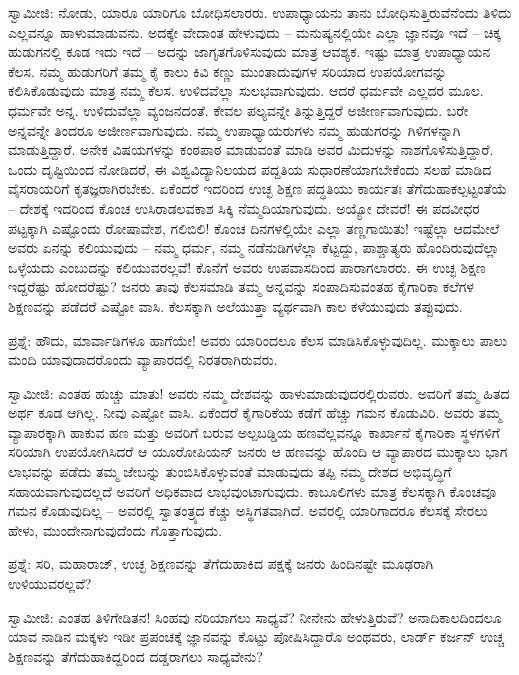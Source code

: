 ಸ್ವಾಮೀಜಿ: ನೋಡು, ಯಾರೂ ಯಾರಿಗೂ ಬೋಧಿಸಲಾರರು. ಉಪಾಧ್ಯಾಯನು ತಾನು ಬೋಧಿಸುತ್ತಿರುವೆನೆಂದು ತಿಳಿದು ಎಲ್ಲವನ್ನೂ ಹಾಳುಮಾಡುವನು. ಅದಕ್ಕೇ ವೇದಾಂತ ಹೇಳುವುದು – ಮನುಷ್ಯನಲ್ಲಿಯೇ ಎಲ್ಲಾ ಜ್ಞಾನವೂ ಇದೆ – ಚಿಕ್ಕ ಹುಡುಗನಲ್ಲಿ ಕೂಡ ಇದು ಇದೆ – ಅದನ್ನು ಜಾಗೃತಗೊಳಿಸುವುದು ಮಾತ್ರ ಆವಶ್ಯಕ. ಇಷ್ಟು ಮಾತ್ರ ಉಪಾಧ್ಯಾಯನ ಕೆಲಸ. ನಮ್ಮ ಹುಡುಗರಿಗೆ ತಮ್ಮ ಕೈ ಕಾಲು ಕಿವಿ ಕಣ್ಣು ಮುಂತಾದುವುಗಳ ಸರಿಯಾದ ಉಪಯೋಗವನ್ನು ಕಲಿಸಿಕೊಡುವುದು ಮಾತ್ರ ನಮ್ಮ ಕೆಲಸ. ಉಳಿದವೆಲ್ಲಾ ಸುಲಭವಾಗುವುದು. ಆದರೆ ಧರ್ಮವೇ ಎಲ್ಲದರ ಮೂಲ. ಧರ್ಮವೇ ಅನ್ನ. ಉಳಿದುವೆಲ್ಲಾ ವ್ಯಂಜನದಂತೆ. ಕೇವಲ ಪಲ್ಯವನ್ನೇ ತಿನ್ನುತ್ತಿದ್ದರೆ ಅಜೀರ್ಣವಾಗುವುದು. ಬರೇ ಅನ್ನವನ್ನೇ ತಿಂದರೂ ಅಜೀರ್ಣವಾಗುವುದು. ನಮ್ಮ ಉಪಾಧ್ಯಾಯರುಗಳು ನಮ್ಮ ಹುಡುಗರನ್ನು ಗಿಳಿಗಳನ್ನಾಗಿ ಮಾಡುತ್ತಿದ್ದಾರೆ. ಅನೇಕ ವಿಷಯಗಳನ್ನು ಕಂಠಪಾಠ ಮಾಡುವಂತೆ ಮಾಡಿ ಅವರ ಮಿದುಳನ್ನು ನಾಶಗೊಳಿಸುತ್ತಿದ್ದಾರೆ. ಒಂದು ದೃಷ್ಟಿಯಿಂದ ನೋಡಿದರೆ, ಈ ವಿಶ್ವವಿದ್ಯಾನಿಲಯದ ಪದ್ದತಿಯ ಸುಧಾರಣೆಯಾಗಬೇಕೆಂದು ಸಲಹೆ ಮಾಡಿದ ವೈಸರಾಯರಿಗೆ ಕೃತಜ್ಞರಾಗಿರಬೇಕು. ಏಕೆಂದರೆ ಇದರಿಂದ ಉಚ್ಛ ಶಿಕ್ಷಣ ಪದ್ಧತಿಯು ಕಾರ್ಯತಃ ತೆಗೆದುಹಾಕಲ್ಪಟ್ಟಂತೆಯೆ – ದೇಶಕ್ಕೆ ಇದರಿಂದ ಕೊಂಚ ಉಸಿರಾಡಲವಕಾಶ ಸಿಕ್ಕಿ ನೆಮ್ಮದಿಯಾಗುವುದು. ಅಯ್ಯೋ ದೇವರೆ! ಈ ಪದವೀಧರ ಪಟ್ಟಕ್ಕಾಗಿ ಎಷ್ಟೊಂದು ರೋಷಾವೇಶ, ಗಲಿಬಿಲಿ! ಕೊಂಚ ದಿನಗಳಲ್ಲಿಯೇ ಎಲ್ಲಾ ತಣ್ಣಗಾಯಿತು! ಇಷ್ಟೆಲ್ಲಾ ಆದಮೇಲೆ ಅವರು ಏನನ್ನು ಕಲಿಯುವುದು – ನಮ್ಮ ಧರ್ಮ, ನಮ್ಮ ನಡೆನುಡಿಗಳೆಲ್ಲಾ ಕೆಟ್ಟದ್ದು, ಪಾಶ್ಚಾತ್ಯರು ಹೊಂದಿರುವುದೆಲ್ಲಾ ಒಳ್ಳೆಯದು ಎಂಬುದನ್ನು ಕಲಿಯುವರಲ್ಲವೆ! ಕೊನೆಗೆ ಅವರು ಉಪವಾಸದಿಂದ ಪಾರಾಗಲಾರರು. ಈ ಉಚ್ಛ ಶಿಕ್ಷಣ ಇದ್ದರೆಷ್ಟು ಹೋದರೆಷ್ಟು? ಜನರು ತಾವು ಕೆಲಸಮಾಡಿ ತಮ್ಮ ಅನ್ನವನ್ನು ಸಂಪಾದಿಸುವಂತಹ ಕೈಗಾರಿಕಾ ಕಲೆಗಳ ಶಿಕ್ಷಣವನ್ನು ಪಡೆದರೆ ಎಷ್ಟೋ ವಾಸಿ. ಕೆಲಸಕ್ಕಾಗಿ ಅಲೆಯುತ್ತಾ ವ್ಯರ್ಥವಾಗಿ ಕಾಲ ಕಳೆಯುವುದು ತಪ್ಪುವುದು.

ಪ್ರಶ್ನೆ: ಹೌದು, ಮಾರ್ವಾಡಿಗಳೂ ಹಾಗೆಯೇ! ಅವರು ಯಾರಿಂದಲೂ ಕೆಲಸ ಮಾಡಿಸಿಕೊಳ್ಳುವುದಿಲ್ಲ. ಮುಕ್ಕಾಲು ಪಾಲು ಮಂದಿ ಯಾವುದಾದರೊಂದು ವ್ಯಾಪಾರದಲ್ಲಿ ನಿರತರಾಗಿರುವರು.

ಸ್ವಾಮೀಜಿ: ಎಂತಹ ಹುಚ್ಚು ಮಾತು! ಅವರು ನಮ್ಮ ದೇಶವನ್ನು ಹಾಳುಮಾಡುವುದರಲ್ಲಿರುವರು. ಅವರಿಗೆ ತಮ್ಮ ಹಿತದ ಅರ್ಥ ಕೂಡ ಆಗಿಲ್ಲ. ನೀವು ಎಷ್ಟೋ ವಾಸಿ. ಏಕೆಂದರೆ ಕೈಗಾರಿಕೆಯ ಕಡೆಗೆ ಹೆಚ್ಚು ಗಮನ ಕೊಡುವಿರಿ. ಅವರು ತಮ್ಮ ವ್ಯಾಪಾರಕ್ಕಾಗಿ ಹಾಕುವ ಹಣ ಮತ್ತು ಅವರಿಗೆ ಬರುವ ಅಲ್ಪಬಡ್ಡಿಯ ಹಣವೆಲ್ಲವನ್ನೂ ಕಾರ್ಖಾನೆ ಕೈಗಾರಿಕಾ ಸ್ಥಳಗಳಿಗೆ ಸರಿಯಾಗಿ ಉಪಯೋಗಿಸಿದರೆ ಆ ಯೂರೋಪಿಯನ್ ಜನರು ಆ ಹಣವನ್ನು ಹೊಂದಿ ಆ ವ್ಯಾಪಾರದ ಮುಕ್ಕಾಲು ಭಾಗ ಲಾಭವನ್ನು ಪಡೆದು ತಮ್ಮ ಜೇಬನ್ನು ತುಂಬಿಸಿಕೊಳ್ಳುವಂತೆ ಮಾಡುವುದು ತಪ್ಪಿ ನಮ್ಮ ದೇಶದ ಅಭಿವೃದ್ಧಿಗೆ ಸಹಾಯವಾಗುವುದಲ್ಲದೆ ಅವರಿಗೆ ಅಧಿಕವಾದ ಲಾಭವುಂಟಾಗುವುದು. ಕಾಬೂಲಿಗಳು ಮಾತ್ರ ಕೆಲಸಕ್ಕಾಗಿ ಕೊಂಚವೂ ಗಮನ ಕೊಡುವುದಿಲ್ಲ – ಅವರಲ್ಲಿ ಸ್ವಾತಂತ್ರ್ಯದ ಕೆಚ್ಚು ಅಸ್ಥಿಗತವಾಗಿದೆ. ಅವರಲ್ಲಿ ಯಾರಿಗಾದರೂ ಕೆಲಸಕ್ಕೆ ಸೇರಲು ಹೇಳು, ಮುಂದೇನಾಗುವುದೆಂದು ಗೊತ್ತಾಗುವುದು.

ಪ್ರಶ್ನೆ: ಸರಿ, ಮಹಾರಾಜ್, ಉಚ್ಛ ಶಿಕ್ಷಣವನ್ನು ತೆಗೆದುಹಾಕಿದ ಪಕ್ಷಕ್ಕೆ ಜನರು ಹಿಂದಿನಷ್ಟೇ ಮೂಢರಾಗಿ ಉಳಿಯುವರಲ್ಲವೆ?

ಸ್ವಾಮೀಜಿ: ಎಂತಹ ತಿಳಿಗೇಡಿತನ! ಸಿಂಹವು ನರಿಯಾಗಲು ಸಾಧ್ಯವೆ? ನೀನೇನು ಹೇಳುತ್ತಿರುವೆ? ಅನಾದಿಕಾಲದಿಂದಲೂ ಯಾವ ನಾಡಿನ ಮಕ್ಕಳು ಇಡೀ ಪ್ರಪಂಚಕ್ಕೆ ಜ್ಞಾನವನ್ನು ಕೊಟ್ಟು ಪೋಷಿಸಿದ್ದಾರೊ ಅಂಥವರು, ಲಾರ್ಡ್ ಕರ್ಜನ್ ಉಚ್ಚ ಶಿಕ್ಷಣವನ್ನು ತೆಗೆದುಹಾಕಿದ್ದರಿಂದ ದಡ್ಡರಾಗಲು ಸಾಧ್ಯವೇನು?

